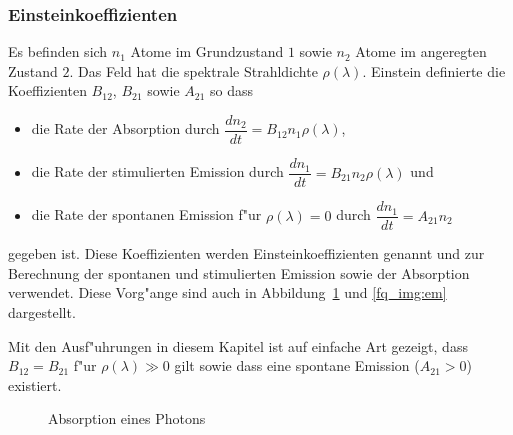 \begin{refsection}
\subsubsection{Einsteinkoeffizienten}
Es befinden sich $n_1$ Atome im Grundzustand $1$ sowie $n_2$ Atome im angeregten Zustand $2$. Das Feld hat die spektrale Strahldichte $\rho(\lambda)$. Einstein definierte die Koeffizienten $B_{12}$, $B_{21}$ sowie $A_{21}$ so dass
\begin{itemize}
	\item die Rate der Absorption durch $\dfrac{dn_2}{dt} = B_{12} n_1 \rho(\lambda)$,
	\item die Rate der stimulierten Emission durch $\dfrac{dn_1}{dt} = B_{21} n_2 \rho(\lambda)$ und
	\item die Rate der spontanen Emission f"ur $\rho(\lambda)=0$ durch $\dfrac{dn_1}{dt} = A_{21} n_2$
\end{itemize}
gegeben ist. Diese Koeffizienten werden Einsteinkoeffizienten \cite{fq:einstein_koeff} genannt und zur Berechnung der spontanen und stimulierten Emission sowie der Absorption verwendet. Diese Vorg"ange sind auch in Abbildung~\ref{fq_img:abs} und \ref{fq_img:em} dargestellt.

Mit den Ausf"uhrungen in diesem Kapitel ist auf einfache Art gezeigt, dass $B_{12} = B_{21}$ f"ur $\rho(\lambda) \gg 0$ gilt sowie dass eine spontane Emission ($A_{21} > 0$) existiert.

\begin{figure}
	\centering
	\caption{Absorption eines Photons
		\label{fq_img:abs}}
\end{figure}

\begin{figure}
	\centering
\end{figure}
\end{refsection}
